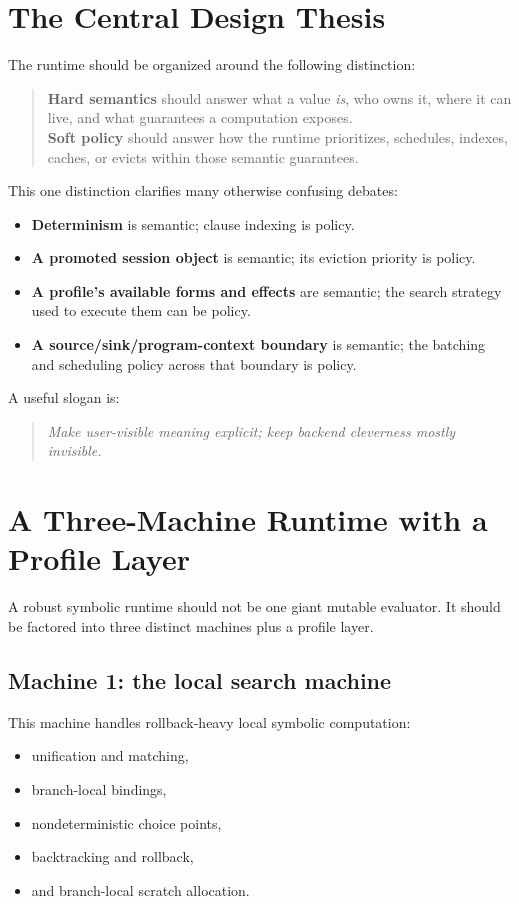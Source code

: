 \documentclass[11pt]{article}
\begin{document}
\section{The Central Design Thesis}

The runtime should be organized around the following distinction:

\begin{quote}
\textbf{Hard semantics} should answer what a value \emph{is}, who owns it, where it can live, and what guarantees a computation exposes. \\
\textbf{Soft policy} should answer how the runtime prioritizes, schedules, indexes, caches, or evicts within those semantic guarantees.
\end{quote}

This one distinction clarifies many otherwise confusing debates:
\begin{itemize}[leftmargin=2em]
  \item \textbf{Determinism} is semantic; clause indexing is policy.
  \item \textbf{A promoted session object} is semantic; its eviction priority is policy.
  \item \textbf{A profile's available forms and effects} are semantic; the search strategy used to execute them can be policy.
  \item \textbf{A source/sink/program-context boundary} is semantic; the batching and scheduling policy across that boundary is policy.
\end{itemize}

A useful slogan is:
\begin{quote}
\emph{Make user-visible meaning explicit; keep backend cleverness mostly invisible.}
\end{quote}

\section{A Three-Machine Runtime with a Profile Layer}

A robust symbolic runtime should not be one giant mutable evaluator. It should be factored into three distinct machines plus a profile layer.

\subsection{Machine 1: the local search machine}

This machine handles rollback-heavy local symbolic computation:
\begin{itemize}[leftmargin=2em]
  \item unification and matching,
  \item branch-local bindings,
  \item nondeterministic choice points,
  \item backtracking and rollback,
  \item and branch-local scratch allocation.
\end{itemize}
\end{document}
